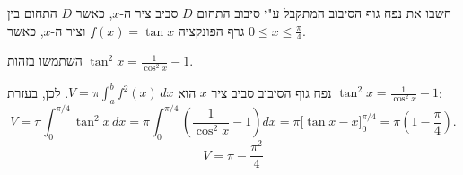 
\begin{question}
חשבו את נפח גוף הסיבוב המתקבל ע"י סיבוב התחום $D$ סביב ציר ה-$x$, כאשר $D$ התחום בין גרף הפונקציה $f(x)=\tan x$ וציר ה-$x$, כאשר $0\le x\le\frac\pi4$.
\end{question}

\begin{hint}
השתמשו בזהות $\tan^2x=\frac{1}{\cos^2x}-1$.
\end{hint}

\begin{solution}
נפח גוף הסיבוב סביב ציר $x$ הוא $V=\pi\int_a^b f^2(x)\,dx$. לכן, בעזרת $\tan^2x=\frac1{\cos^2x}-1$:
\[ V=\pi\int_0^{\pi/4}\tan^2x\,dx=\pi\int_0^{\pi/4}\left(\frac1{\cos^2x}-1\right)dx=\pi\Big[\tan x-x\Big]_0^{\pi/4}=\pi\left(1-\frac\pi4\right). \]
\[ \boxed{V=\pi-\frac{\pi^2}{4}} \]
\end{solution}
